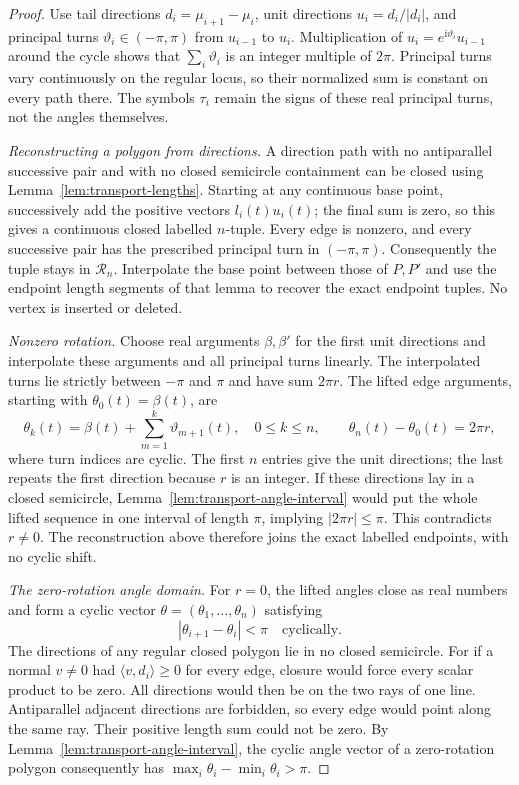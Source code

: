\begin{proof}
Use tail directions $d_i=\mu_{i+1}-\mu_i$, unit directions $u_i=d_i/|d_i|$,
and principal turns $\vartheta_i\in(-\pi,\pi)$ from $u_{i-1}$ to $u_i$.
Multiplication of $u_i=e^{\mathrm i\vartheta_i}u_{i-1}$ around the cycle
shows that $\sum_i\vartheta_i$ is an integer multiple of $2\pi$.
Principal turns vary continuously on the regular locus, so their normalized
sum is constant on every path there. The symbols $\tau_i$ remain the signs
of these real principal turns, not the angles themselves.

\emph{Reconstructing a polygon from directions.}
A direction path with no antiparallel successive pair and with no closed
semicircle containment can be closed using
Lemma~\ref{lem:transport-lengths}. Starting at any continuous base point,
successively add the positive vectors $l_i(t)u_i(t)$; the final sum is zero,
so this gives a continuous closed labelled $n$-tuple. Every edge is nonzero,
and every successive pair has the prescribed principal turn in $(-\pi,\pi)$.
Consequently the tuple stays in $\mathcal R_n$. Interpolate the base point
between those of $P,P'$ and use the endpoint length segments of that lemma
to recover the exact endpoint tuples. No vertex is inserted or deleted.

\emph{Nonzero rotation.}
Choose real arguments $\beta,\beta'$ for the first unit directions and
interpolate these arguments and all principal turns linearly. The interpolated
turns lie strictly between $-\pi$ and $\pi$ and have sum $2\pi r$.
The lifted edge arguments, starting with $\theta_0(t)=\beta(t)$, are
\begin{equation}\label{transport:prefix}
 \theta_k(t)=\beta(t)+\sum_{m=1}^{k}\vartheta_{m+1}(t),
 \quad 0\leq k\leq n,
 \qquad \theta_n(t)-\theta_0(t)=2\pi r,
\end{equation}
where turn indices are cyclic. The first $n$ entries give the unit directions;
the last repeats the first direction because $r$ is an integer. If these
directions lay in a closed semicircle,
Lemma~\ref{lem:transport-angle-interval} would put the whole lifted sequence
in one interval of length $\pi$, implying $|2\pi r|\leq\pi$.
This contradicts $r\ne0$. The reconstruction above therefore joins the exact
labelled endpoints, with no cyclic shift.

\emph{The zero-rotation angle domain.}
For $r=0$, the lifted angles close as real numbers and form a cyclic vector
$\theta=(\theta_1,\ldots,\theta_n)$ satisfying
\begin{equation}\label{transport:zero-angle-domain}
 |\theta_{i+1}-\theta_i|<\pi\quad\text{cyclically}.
\end{equation}
The directions of any regular closed polygon lie in no closed semicircle.
For if a normal $v\ne0$ had $\langle v,d_i\rangle\geq0$ for every edge,
closure would force every scalar product to be zero. All directions would
then be on the two rays of one line. Antiparallel adjacent directions are
forbidden, so every edge would point along the same ray. Their positive
length sum could not be zero. By
Lemma~\ref{lem:transport-angle-interval}, the cyclic angle vector of a
zero-rotation polygon consequently has
$\max_i\theta_i-\min_i\theta_i>\pi$.


\end{proof}
